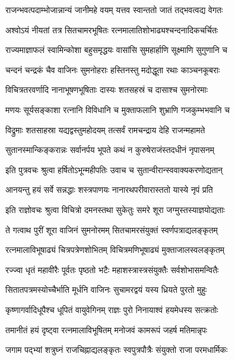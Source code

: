 \twolineshloka
{राजन्भवत्पदाम्भोजान्नान्यं जानीमहे वयम्}
{यत्तव स्वान्ततो जातं तद्भवत्वद्य वेगतः}%

\twolineshloka
{अश्वोऽयं नीयतां तत्र सितचामरभूषितः}
{रत्नमालातिशोभाढ्यश्चन्दनादिकचर्चितः}%

\twolineshloka
{राज्यमाज्ञाफलं स्वामिन्कोशा बहुसमृद्धयः}
{वासांसि सुमहार्हाणि सूक्ष्माणि सुगुणानि च}%

\twolineshloka
{चन्दनं चन्द्रकं चैव वाजिनः सुमनोहराः}
{हस्तिनस्तु मदोद्धूता रथाः काञ्चनकूबराः}%

\twolineshloka
{विचित्रतरवर्णादि नानाभूषणभूषिताः}
{दास्यः शतसहस्रं च दासाश्च सुमनोरमाः}%

\twolineshloka
{मणयः सूर्यसङ्काशा रत्नानि विविधानि च}
{मुक्ताफलानि शुभ्राणि गजकुम्भभवानि च}%

\twolineshloka
{विद्रुमाः शतसाहस्रा यद्यद्वस्तुमहोदयम्}
{तत्सर्वं रामचन्द्राय देहि राजन्महामते}%

\twolineshloka
{सुतानस्मान्किङ्करान्नः सर्वानर्पय भूपते}
{कथं न कुरुषेराजंस्तदधीनं नृपासनम्}%


\twolineshloka
{इति पुत्रवचः श्रुत्वा हर्षितोऽभून्महीपतिः}
{उवाच च सुतान्वीरान्स्ववाक्यकरणोद्यतान्}%


\twolineshloka
{आनयन्तु हयं सर्वे सन्नद्धाः शस्त्रपाणयः}
{नानारथपरीवारास्ततो यास्ये नृपं प्रति}%


\twolineshloka
{इति राज्ञोवचः श्रुत्वा विचित्रो दमनस्तथा}
{सुकेतुः समरे शूरा जग्मुस्तस्याज्ञयोद्यताः}%

\twolineshloka
{ते गत्वाथ पुरीं शूरा वाजिनं सुमनोरमम्}
{सितचामरसंयुक्तं स्वर्णपत्राद्यलङ्कृतम्}%

\twolineshloka
{रत्नमालाविभूषाढ्यं चित्रपत्रेणशोभितम्}
{विचित्रमणिभूषाढ्यं मुक्ताजालस्वलङ्कृतम्}%

\twolineshloka
{रज्ज्वा धृतं महावीरैः पूर्वतः पृष्ठतो भटैः}
{महाशस्त्रास्त्रसंयुक्तैः सर्वशोभासमन्वितैः}%

\twolineshloka
{सितातपत्रमस्योच्चैर्भाति मूर्धनि वाजिनः}
{सुचामरद्वयं यस्य ध्रियते पुरतो मुहुः}%

\twolineshloka
{कृष्णागर्वादिधूपैश्च धूपितं वायुवेगिनम्}
{राज्ञः पुरो निनायाश्वं हयमेधस्य सत्क्रतोः}%

\twolineshloka
{तमानीतं हयं दृष्ट्वा रत्नमालाविभूषितम्}
{मनोजवं कामरूपं जहर्ष मतिमान्नृपः}%

\twolineshloka
{जगाम पद्भ्यां शत्रुघ्नं राजचिह्नाद्यलङ्कृतः}
{स्वपुत्रपौत्रैः संयुक्तो राजा परमधार्मिकः}%

